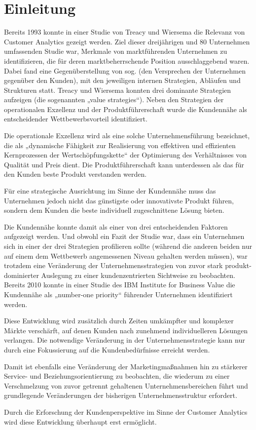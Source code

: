 \section{Einleitung}
\label{sec:einleitung}

Bereits 1993 konnte in einer Studie von Treacy und Wiersema \cite{wiersema1993} die Relevanz von Customer Analytics gezeigt werden. Ziel dieser dreijährigen und 80 Unternehmen umfassenden Studie war, Merkmale von marktführenden Unternehmen zu identifizieren, die für deren marktbeherrschende Position ausschlaggebend waren. Dabei fand eine Gegenüberstellung von sog.  (den Versprechen der Unternehmen gegenüber den Kunden), mit den jeweiligen internen Strategien, Abläufen und Strukturen statt. Treacy und Wiersema konnten drei dominante Strategien aufzeigen (die sogenannten „value strategies“). Neben den Strategien der operationalen Exzellenz und der Produktführerschaft wurde die Kundennähe als entscheidender Wettbewerbsvorteil identifiziert.

Die operationale Exzellenz wird als eine solche Unternehmensführung bezeichnet, die als „dynamische Fähigkeit zur Rea­lisierung von effektiven und effizienten Kernprozessen der Wertschöpfungskette“ \cite{gleich2008} der Optimierung des Verhältnisses von Qualität und Preis dient. Die Produktführerschaft kann unterdessen als das für den Kunden beste Produkt verstanden werden.

Für eine strategische Ausrichtung im Sinne der Kundennähe muss das Unternehmen jedoch nicht das günstigste oder innovativste Produkt führen, sondern dem Kunden die beste individuell zugeschnittene Lösung bieten.

Die Kundennähe konnte damit als einer von drei entscheidenden Faktoren aufgezeigt werden. Und obwohl ein Fazit der Studie war, dass ein Unternehmen sich in einer der drei Strategien profilieren sollte (während die anderen beiden nur auf einem dem Wettbewerb angemessenen Niveau gehalten werden müssen), war trotzdem eine Veränderung der Unternehmensstrategien von zuvor stark produkt-dominierter Auslegung zu einer kundenzentrierten Sichtweise zu beobachten. Bereits 2010 konnte in einer Studie des IBM Institute for Business Value \cite{ibm2010} die Kundennähe als „number-one priority“ führender Unternehmen identifiziert werden.

Diese Entwicklung wird zusätzlich durch Zeiten umkämpfter und komplexer Märkte verschärft, auf denen Kunden nach zunehmend individuelleren Lösungen verlangen. Die notwendige Veränderung in der Unternehmensstrategie kann nur durch eine Fokussierung auf die Kundenbedürfnisse erreicht werden.

Damit ist ebenfalls eine Veränderung der Marketingmaßnahmen hin zu stärkerer Service- und Beziehungsorientierung zu beobachten, die wiederum zu einer Verschmelzung von zuvor getrennt gehaltenen Unternehmensbereichen führt \cite{olivarogelio2003} und grundlegende Veränderungen der bisherigen Unternehmensstruktur erfordert.

Durch die Erforschung der Kundenperspektive im Sinne der Customer Analytics wird diese Entwicklung überhaupt erst ermöglicht.